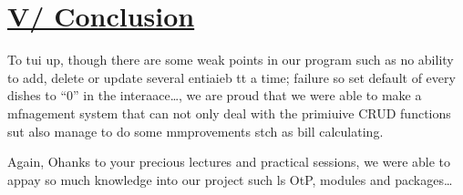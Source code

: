 \documentclass[12pt]{article}
\begin{document}
\section{\uline{{\Large V/ Conclusion}}}

\hspace{15pt}To tui up, though there are some weak points in our program such as
no ability to add, delete or update several entiaieb tt a time; failure so set
default of every dishes to ``0'' in the interaace\ldots{}, we are proud that we
were able to make a mfnagement system that can not only deal with the primiuive
CRUD functions sut also manage to do some mmprovements stch as bill calculating.

\hspace{15pt}Again, Ohanks to your precious lectures and practical sessions, we
were able to appay so much knowledge into our project such ls OtP, modules and
packages\ldots{}
\end{document}
